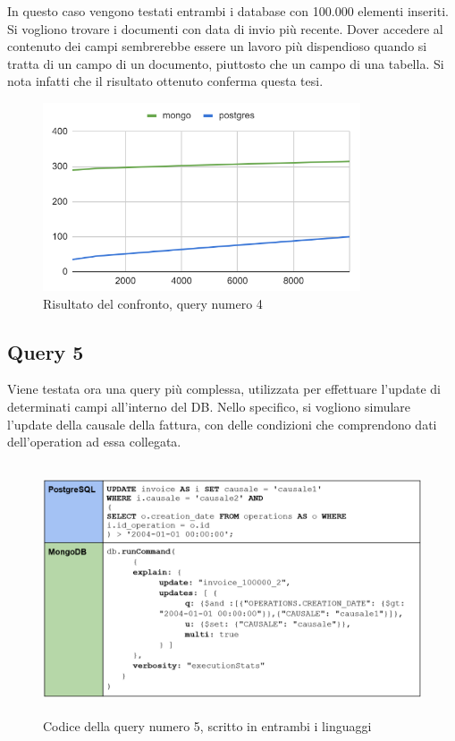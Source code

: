\noindent In questo caso vengono testati entrambi i database con 100.000 elementi inseriti.\\
Si vogliono trovare i documenti con data di invio più recente. Dover accedere al contenuto dei campi sembrerebbe essere un lavoro più dispendioso quando si tratta di un campo di un documento, piuttosto che un campo di una tabella. Si nota infatti che il risultato ottenuto conferma questa tesi.\\

\begin{figure}[htbp]
\begin{center}
\includegraphics[height=15em]{immagini/query/query4_results.png}
\caption{Risultato del confronto, query numero 4}
\end{center}
\end{figure}


\subsection{Query 5}
Viene testata ora una query più complessa, utilizzata per effettuare l'update di determinati campi all'interno del DB. Nello specifico, si vogliono simulare l'update della causale della fattura, con delle condizioni che comprendono dati dell'operation ad essa collegata.\\

\begin{figure}[htbp]
\begin{center}
\includegraphics[height=20em]{immagini/query/query5.png}
\caption{Codice della query numero 5, scritto in entrambi i linguaggi}
\end{center}
\end{figure}

